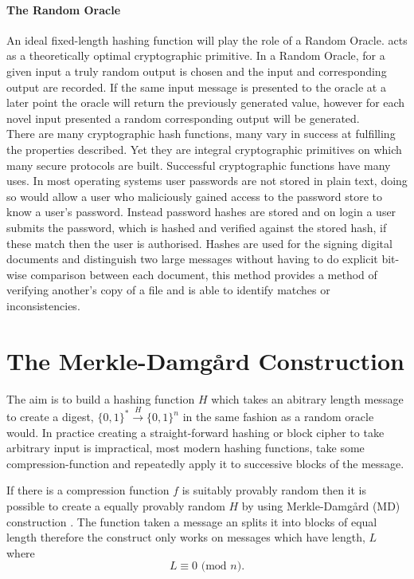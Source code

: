 \documentclass[a4paper,12pt]{article}
\begin{document}
\paragraph{The Random Oracle} An ideal fixed-length hashing function will play the role of a Random Oracle. acts as a theoretically optimal cryptographic primitive. In a Random Oracle, for a given input a truly random output is chosen and the input and corresponding output are recorded. If the same input message is presented to the oracle at a later point the oracle will return the previously generated value, however for each novel input presented a random corresponding output will be generated.\\



There are many cryptographic hash functions, many vary in success at fulfilling the properties described. Yet they are integral cryptographic primitives on which many secure protocols are built. Successful cryptographic functions have many uses. In most operating systems user passwords are not stored in plain text, doing so would allow a user who maliciously gained access to the password store to know a user's password. Instead password hashes are stored and on login a user submits the password, which is hashed and verified against the stored hash, if these match then the user is authorised. Hashes are used for the signing digital documents and distinguish two large messages without having to do explicit bit-wise comparison between each document, this method provides a method of verifying another's copy of a file and is able to identify matches or inconsistencies.

\section{The Merkle-Damg\r{a}rd Construction}
The aim is to build a hashing function $H$ which takes an abitrary length message to create a digest, $\{0,1\}^* \xrightarrow{H} \{0,1\}^n$ in the same fashion as a random oracle would. In practice creating a straight-forward hashing or block cipher to take arbitrary input is impractical, most modern hashing functions, take some compression-function and repeatedly apply it to successive blocks of the message.

If there is a compression function $f$ is suitably provably random then it is possible to create a equally provably random $H$ by using Merkle-Damg\r{a}rd (MD) construction \cite{Merkle1979}. The function taken a message an splits it into blocks of equal length therefore the construct only works on messages which have length, $L$ where $$L \equiv 0 \text{ (mod } n).$$
\end{document}
